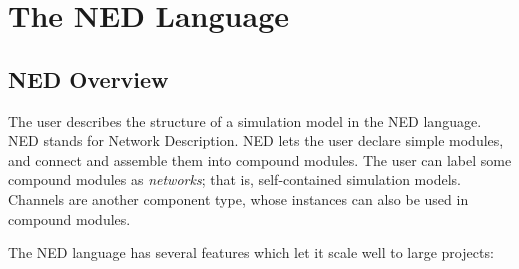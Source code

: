 \chapter{The NED Language}
\label{cha:the-ned-language}


\section{NED Overview}

The user describes the structure of a simulation model in the NED language. NED
stands for Network Description. NED lets the user declare simple modules, and
connect and assemble them into compound modules. The user can label some compound
modules as \textit{networks}; that is, self-contained simulation models. Channels are
another component type, whose instances can also be used in compound modules.

The NED language has several features which let it scale well to large projects:

